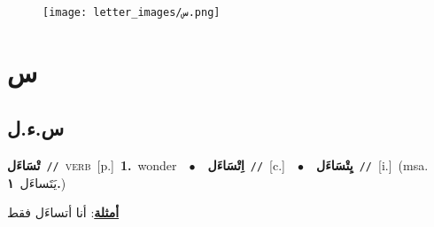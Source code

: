 \documentclass[10pt,a4paper,twoside]{article} %
\begin{document}
\begin{figure*}[t!]\centering\texttt{[image: letter\_images/س.png]}\end{figure*}
\color{white}

 \section*{\foreignlanguage{arabic}{س}} 
 \begin{multicols}{2} 

%
\color{black}
\vspace{-3mm}
\subsection*{\color{blue}\foreignlanguage{arabic}{س.ء.ل}\color{blue}{}} 

{\setlength\topsep{0pt}\textbf{\foreignlanguage{arabic}{تْسَاءَل}}\ {\color{gray}\texttt{//}\color{black}}\ \textsc{verb}\ [p.]\ \textbf{1.}~wonder\ \ $\bullet$\ \ \setlength\topsep{0pt}\textbf{\foreignlanguage{arabic}{اِتْسَاءَل}}\ {\color{gray}\texttt{//}\color{black}}\ [c.]\ \ $\bullet$\ \ \setlength\topsep{0pt}\textbf{\foreignlanguage{arabic}{يِتْسَاءَل}}\ {\color{gray}\texttt{//}\color{black}}\ [i.]\ \color{gray}(msa. \foreignlanguage{arabic}{يَتَساءَل}~\foreignlanguage{arabic}{\textbf{١.}})\color{black}\  \begin{flushright}\color{gray}\foreignlanguage{arabic}{\textbf{\underline{\foreignlanguage{arabic}{أمثلة}}}: أنا أتساءَل فقط}\end{flushright}\color{black}} \vspace{2mm}


\end{multicols}
\end{document}
